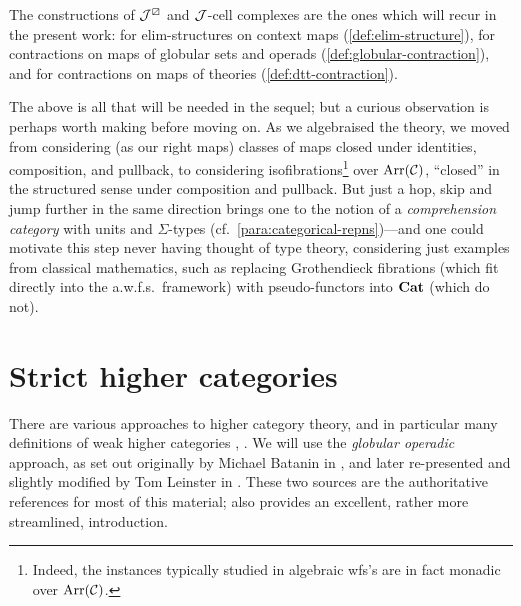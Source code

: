 \begin{para}
The constructions of $\mathcal{J}^\boxslash$ and $\mathcal{J}$-cell complexes are the ones which will recur in the present work: for elim-structures on context maps (\ref{def:elim-structure}), for contractions on maps of globular sets and operads (\ref{def:globular-contraction}), and for contractions on maps of theories (\ref{def:dtt-contraction}).
\end{para}

\begin{para}
The above is all that will be needed in the sequel; but a curious observation is perhaps worth making before moving on.  As we algebraised the theory, we moved from considering (as our right maps) classes of maps closed under identities, composition, and pullback, to considering isofibrations\footnote{Indeed, the instances typically studied in algebraic wfs's are in fact monadic over $\mathrm{Arr}(\mathcal{C})$.} over $\mathrm{Arr}(\mathcal{C})$, ``closed'' in the structured sense under composition and pullback.  But just a hop, skip and jump further in the same direction brings one to the notion of a \emph{comprehension category} with units and $\Sigma$-types (cf.\ \ref{para:categorical-repns})---and one could motivate this step never having thought of type theory, considering just examples from classical mathematics, such as replacing Grothendieck fibrations (which fit directly into the a.w.f.s.\ framework) with pseudo-functors into $\mathbf{Cat}$ (which do not).
\end{para}

\section{Strict higher categories}

\begin{para}There are various approaches to higher category theory, and in particular many definitions of weak higher categories \cite{leinster:survey}, \cite{cheng-lauda:guidebook}.  We will use the \emph{globular operadic} approach, as set out originally by Michael Batanin in \cite{batanin:natural-environment}, and later re-presented and slightly modified by Tom Leinster in \cite{leinster:book}.  These two sources are the authoritative references for most of this material; \cite{leinster:survey} also provides an excellent, rather more streamlined, introduction.
\end{para}

